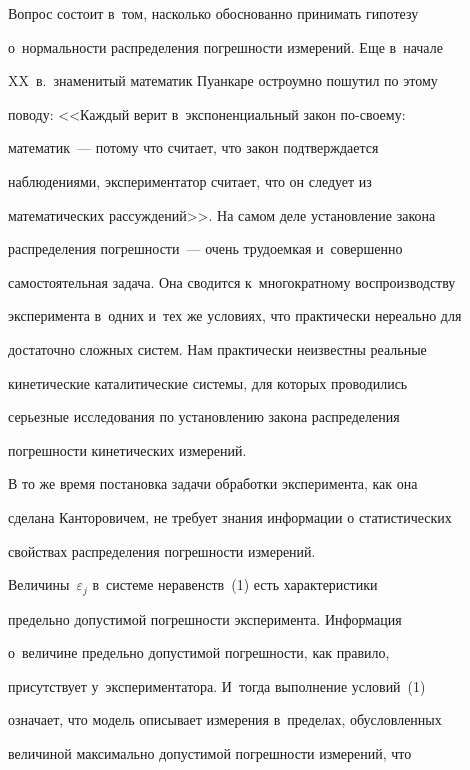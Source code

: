 {



}

  

  Вопрос состоит в~том, насколько обоснованно принимать гипотезу 

о~нормальности распределения погрешности измерений. Еще в~начале 

XX~в.\ знаменитый математик Пуанкаре остроумно пошутил по этому 

поводу: <<Каждый верит в~экспоненциальный закон по-сво\-ему: 

математик~--- потому что считает, что закон подтверждается 

наблюдениями, экспериментатор считает, что он следует из 

математических рассуждений>>. На самом деле установление закона 

распределения погрешности~--- очень трудоемкая и~совершенно 

самостоятельная задача. Она сводится к~многократному воспроизводству 

эксперимента в~одних и~тех же условиях, что практически нереально для 

достаточно сложных систем. Нам практически неизвестны реальные 

кинетические каталитические системы, для которых проводились 

серьезные исследования по установлению закона распределения 

погрешности кинетических измерений.

  

  В то же время постановка задачи обработки эксперимента, как она 

сделана Канторовичем, не требует знания информации о статистических 

свойствах распределения погрешности измерений. 

Величины~$\varepsilon_j$ в~системе неравенств~(1) есть характеристики 

предельно допустимой погрешности эксперимента. Информация 

о~величине предельно допустимой погрешности, как правило, 

присутствует у~экспериментатора. И~тогда выполнение условий~(1) 

означает, что модель описывает измерения в~пределах, обусловленных 

величиной максимально допустимой погрешности измерений, что 

